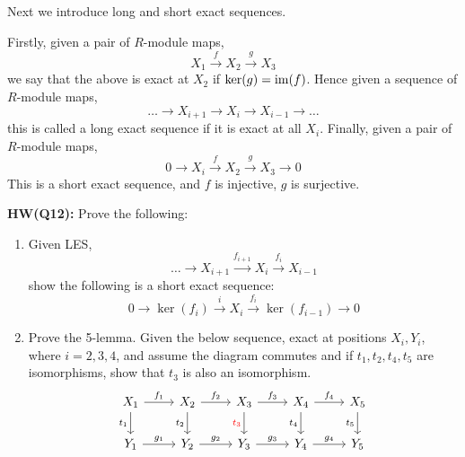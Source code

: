 Next we introduce long and short exact sequences.
\begin{defn}[exactness]
    Firstly, given a pair of $R$-module maps, 
    \begin{equation*}
        X_1\xrightarrow{f}X_2\xrightarrow{g}X_3
    \end{equation*}
    we say that the above is exact at $X_2$ if $\ker(g)=\operatorname{im}(f)$. Hence given a sequence of $R$-module maps, 
    \begin{equation*}
        \dots\to X_{i+1}\to X_i\to X_{i-1}\to\dots
    \end{equation*}
    this is called a long exact sequence if it is exact at all $X_i$. Finally, given a pair of $R$-module maps,
    \begin{equation*}
        0\to X_i\xrightarrow{f}X_2\xrightarrow{g}X_3\to 0
    \end{equation*}
    This is a short exact sequence, and $f$ is injective, $g$ is surjective. 
\end{defn}
\begin{prob}
    \textbf{HW(Q12):} Prove the following:
    \begin{enumerate}
        \item Given  LES, 
        \begin{equation*}
            \dots\to X_{i+1}\xrightarrow{f_{i+1}}X_i\xrightarrow{f_i}X_{i-1}
        \end{equation*}
        show the following is a short exact sequence:
        \begin{equation*}
            0\to\ker(f_i)\xrightarrow{i}X_i\xrightarrow{f_i}\ker(f_{i-1})\to 0
        \end{equation*}
        \item Prove the 5-lemma. Given the below sequence, exact at positions $X_i, Y_i$, where $i=2,3,4$, and assume the diagram commutes and if $t_1,t_2,t_4,t_5$ are isomorphisms, show that $t_3$ is also an isomorphism.
        \[\begin{tikzcd}
            {X_1} & {X_2} & {X_3} & {X_4} & {X_5} \\
            {Y_1} & {Y_2} & {Y_3} & {Y_4} & {Y_5}
            \arrow["{f_1}", from=1-1, to=1-2]
            \arrow["{t_1}"', from=1-1, to=2-1]
            \arrow["{f_2}", from=1-2, to=1-3]
            \arrow["{t_2}"', from=1-2, to=2-2]
            \arrow["{f_3}", from=1-3, to=1-4]
            \arrow["{\textcolor{red}{t_3}}"', from=1-3, to=2-3]
            \arrow["{f_4}", from=1-4, to=1-5]
            \arrow["{t_4}"', from=1-4, to=2-4]
            \arrow["{t_5}"', from=1-5, to=2-5]
            \arrow["{g_1}", from=2-1, to=2-2]
            \arrow["{g_2}", from=2-2, to=2-3]
            \arrow["{g_3}", from=2-3, to=2-4]
            \arrow["{g_4}", from=2-4, to=2-5]
        \end{tikzcd}\]
    \end{enumerate}
\end{prob}
